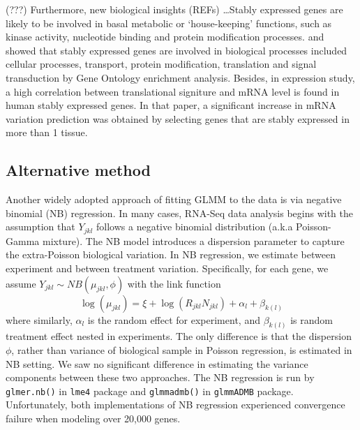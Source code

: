 \documentclass[letterpaper,12pt]{article}
\begin{document}


(???) Furthermore, new biological insights (REFs) \dots Stably expressed genes
are likely to be involved in basal metabolic or ‘house-keeping’ functions, such
as  kinase activity, nucleotide binding and protein modification processes.
\cite{sekhon2011genome} and \cite{wang2010dynamic} showed that stably
expressed genes are involved in biological processes included cellular
processes, transport, protein modification, translation and signal
transduction by Gene Ontology enrichment analysis. Besides, in expression
study, a high correlation between translational signiture and mRNA level is
found in human stably expressed genes\citep{line2013translational}. In that
paper, a significant increase in mRNA variation prediction was obtained by
selecting genes that are stably expressed in more than 1 tissue.\\




  \subsection{Alternative method}
Another widely adopted approach of fitting GLMM to the data is via negative binomial (NB) regression. In many cases,  RNA-Seq data analysis begins with the assumption that $Y_{jkl}$ follows a negative binomial distribution (a.k.a Poisson-Gamma mixture). The NB model introduces a dispersion parameter to capture the extra-Poisson biological variation.  In NB regression, we estimate between experiment and between treatment variation. Specifically,  for each gene, we assume $Y_{jkl}\sim NB(\mu_{jkl}, \phi)$ with the link function
 \[\log(\mu_{jkl})= \xi + \log(R_{jkl}N_{jkl}) + \alpha_l + \beta_{k(l)}\]
where similarly, $\alpha_l$ is the random effect for experiment, and $\beta_{k(l)}$ is random treatment effect nested in experiments.  The only difference is that the dispersion $\phi$, rather than variance of biological sample in Poisson regression, is estimated in NB setting. We saw no significant difference in estimating the variance components between these two approaches. The NB regression is run by \verb"glmer.nb()" in \verb"lme4" package\citep{bates2012lme4} and \verb"glmmadmb()" in \verb"glmmADMB" package\citep{bolker2012getting}. Unfortunately, both implementations of NB regression experienced convergence failure when modeling over 20,000 genes. \\
\end{document}
